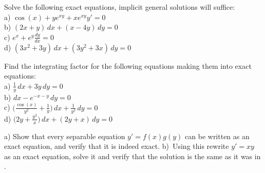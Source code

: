 \documentclass[12pt]{book}
\begin{document}
\setcounter{exercise}{100}

\begin{exercise}
Solve the following exact equations, implicit general solutions
will suffice:\\
a)
$\cos(x)+ye^{xy} + xe^{xy} y' = 0$
\\
b)
$(2x+y)\, dx + (x-4y) \, dy = 0$
\\
c)
$e^x + e^y \frac{dy}{dx} = 0$
\\
d)
$(3x^2+3y)\,dx + (3y^2+3x)\, dy = 0$
\end{exercise}

\begin{exercise}
Find the integrating factor for the following equations making them into
exact equations:\\
a)
$\frac{1}{y}\, dx + 3y \, dy = 0$
\\
b)
$dx - e^{-x-y} \, dy = 0$
\\
c)
$\bigl( \frac{\cos(x)}{y^2} + \frac{1}{y} \bigr) \, dx + \frac{1}{y^2} \, dy = 0$
\\
d)
$\bigl( 2y + \frac{y^2}{x} \bigr) \, dx + ( 2y+x )\, dy = 0$
\end{exercise}

\begin{exercise}
a) Show that every
separable equation $y' = f(x)g(y)$ can be written as an exact equation,
and verify that it is indeed exact.
b)~Using this rewrite $y' = xy$ as an exact equation, solve it and verify
that the solution is the same as it was in .
\end{exercise}

\end{document}

